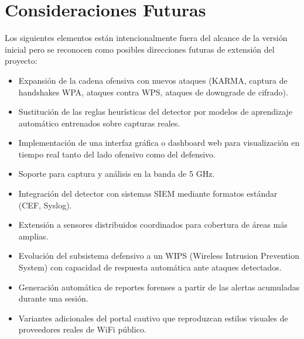 \documentclass[11pt,a4paper]{article}
\begin{document}
\section{Consideraciones Futuras}

Los siguientes elementos están intencionalmente fuera del alcance de la
versión inicial pero se reconocen como posibles direcciones futuras de
extensión del proyecto:

\begin{itemize}
  \item Expansión de la cadena ofensiva con nuevos ataques (KARMA, captura
    de handshakes WPA, ataques contra WPS, ataques de downgrade de cifrado).
  \item Sustitución de las reglas heurísticas del detector por modelos de
    aprendizaje automático entrenados sobre capturas reales.
  \item Implementación de una interfaz gráfica o dashboard web para
    visualización en tiempo real tanto del lado ofensivo como del defensivo.
  \item Soporte para captura y análisis en la banda de 5 GHz.
  \item Integración del detector con sistemas SIEM mediante formatos
    estándar (CEF, Syslog).
  \item Extensión a sensores distribuidos coordinados para cobertura de
    áreas más amplias.
  \item Evolución del subsistema defensivo a un WIPS (Wireless Intrusion
    Prevention System) con capacidad de respuesta automática ante ataques
    detectados.
  \item Generación automática de reportes forenses a partir de las alertas
    acumuladas durante una sesión.
  \item Variantes adicionales del portal cautivo que reproduzcan estilos
    visuales de proveedores reales de WiFi público.
\end{itemize}
\end{document}
